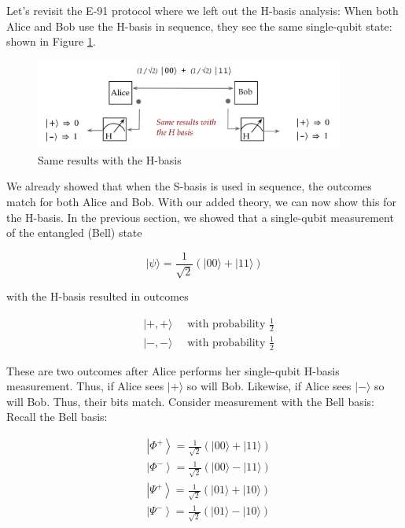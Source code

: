 \documentclass[main.tex]{subfiles}
\begin{document}
    Let's revisit the E-91 protocol where we left out the H-basis analysis: When both Alice and Bob use the H-basis in sequence, they see the same single-qubit state: shown in Figure \ref{fig:08ekert}.
    
    \begin{figure}
        \centering
        \includegraphics[width=4in]{notes/figs/n07/08ekert.png}
        \caption{Same results with the H-basis}
        \label{fig:08ekert}
    \end{figure}
    
    We already showed that when the S-basis is used in sequence, the outcomes match for both Alice and Bob. With our added theory, we can now show this for the H-basis. In the previous section, we showed that a single-qubit measurement of the entangled (Bell) state
    
    $$
    |\psi\rangle=\frac{1}{\sqrt{2}}(|00\rangle+|11\rangle)
    $$
    
    with the $\mathrm{H}$-basis resulted in outcomes
    
    $$
    \begin{aligned}
    &|+,+\rangle \quad \text { with probability } \frac{1}{2} \\
    &|-,-\rangle \quad \text { with probability } \frac{1}{2}
    \end{aligned}
    $$
    
    These are two outcomes after Alice performs her single-qubit H-basis measurement. Thus, if Alice sees $|+\rangle$ so will Bob. Likewise, if Alice sees $|-\rangle$ so will Bob. Thus, their bits match. Consider measurement with the Bell basis: Recall the Bell basis:
    
    $$
    \begin{aligned}
    &\left|\Phi^{+}\right\rangle=\frac{1}{\sqrt{2}}(|00\rangle+|11\rangle) \\
    &\left|\Phi^{-}\right\rangle=\frac{1}{\sqrt{2}}(|00\rangle-|11\rangle) \\
    &\left|\Psi^{+}\right\rangle=\frac{1}{\sqrt{2}}(|01\rangle+|10\rangle) \\
    &\left|\Psi^{-}\right\rangle=\frac{1}{\sqrt{2}}(|01\rangle-|10\rangle)
    \end{aligned}
    $$
    
\end{document}
